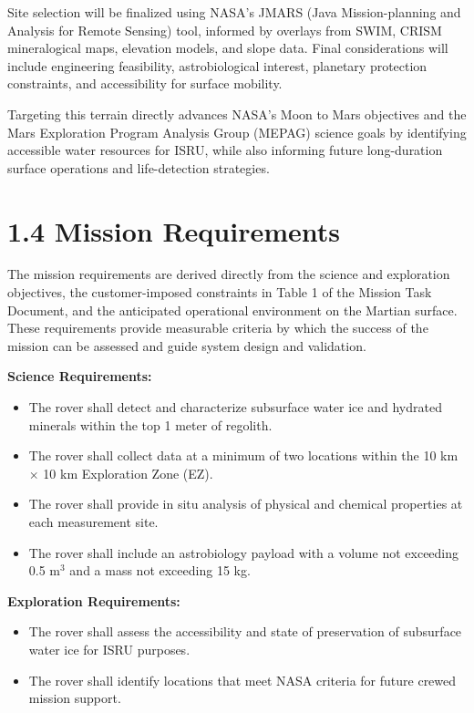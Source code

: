 \documentclass[12pt]{article}
\begin{document}
Site selection will be finalized using NASA’s JMARS (Java Mission-planning and Analysis for Remote Sensing) tool, informed by overlays from SWIM, CRISM mineralogical maps, elevation models, and slope data. Final considerations will include engineering feasibility, astrobiological interest, planetary protection constraints, and accessibility for surface mobility.

Targeting this terrain directly advances NASA’s Moon to Mars objectives and the Mars Exploration Program Analysis Group (MEPAG) science goals by identifying accessible water resources for ISRU, while also informing future long-duration surface operations and life-detection strategies.

\section*{1.4 Mission Requirements}

The mission requirements are derived directly from the science and exploration objectives, the customer-imposed constraints in Table 1 of the Mission Task Document, and the anticipated operational environment on the Martian surface. These requirements provide measurable criteria by which the success of the mission can be assessed and guide system design and validation.

\textbf{Science Requirements:}
\begin{itemize}
    \item The rover shall detect and characterize subsurface water ice and hydrated minerals within the top 1 meter of regolith.
    \item The rover shall collect data at a minimum of two locations within the 10 km $\times$ 10 km Exploration Zone (EZ).
    \item The rover shall provide in situ analysis of physical and chemical properties at each measurement site.
    \item The rover shall include an astrobiology payload with a volume not exceeding 0.5 m$^3$ and a mass not exceeding 15 kg.
\end{itemize}

\textbf{Exploration Requirements:}
\begin{itemize}
    \item The rover shall assess the accessibility and state of preservation of subsurface water ice for ISRU purposes.
    \item The rover shall identify locations that meet NASA criteria for future crewed mission support.
\end{itemize}
\end{document}
